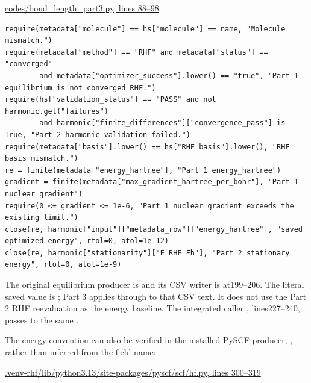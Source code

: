 \documentclass[10pt,a4paper]{article}
\begin{document}
\href{/Users/novaz/Desktop/qml2.0/codes/bond\_length\_part3.py:88}{codes/bond\_length\_part3.py, lines 88–98}

\begin{Verbatim}
require(metadata["molecule"] == hs["molecule"] == name, "Molecule mismatch.")
require(metadata["method"] == "RHF" and metadata["status"] == "converged"
        and metadata["optimizer_success"].lower() == "true", "Part 1 equilibrium is not converged RHF.")
require(hs["validation_status"] == "PASS" and not harmonic.get("failures")
        and harmonic["finite_differences"]["convergence_pass"] is True, "Part 2 harmonic validation failed.")
require(metadata["basis"].lower() == hs["RHF_basis"].lower(), "RHF basis mismatch.")
re = finite(metadata["energy_hartree"], "Part 1 energy_hartree")
gradient = finite(metadata["max_gradient_hartree_per_bohr"], "Part 1 nuclear gradient")
require(0 <= gradient <= 1e-6, "Part 1 nuclear gradient exceeds the existing limit.")
close(re, harmonic["input"]["metadata_row"]["energy_hartree"], "saved optimized energy", rtol=0, atol=1e-12)
close(re, harmonic["stationarity"]["E_RHF_Eh"], "Part 2 stationary energy", rtol=0, atol=1e-9)
\end{Verbatim}
The original equilibrium producer is  and its CSV writer is at199–206. The literal saved value is ; Part 3 applies  through  to that CSV text. It does not use the Part 2 RHF reevaluation as the energy baseline. The integrated caller , lines227–240, passes  to the same .

The energy convention can also be verified in the installed PySCF producer, , rather than inferred from the field name:

\href{/Users/novaz/Desktop/qml2.0/.venv-rhf/lib/python3.13/site-packages/pyscf/scf/hf.py:300}{.venv-rhf/lib/python3.13/site-packages/pyscf/scf/hf.py, lines 300–319}
\end{document}
